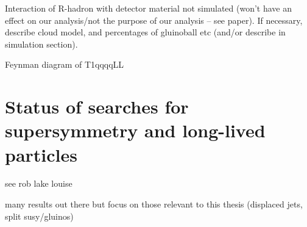 Interaction of R-hadron with detector material not simulated (won't have an 
effect on our analysis/not the purpose of our analysis -- see paper). If 
necessary, describe cloud model, and percentages of gluinoball etc (and/or 
describe in simulation section).

Feynman diagram of T1qqqqLL %






\begin{comment}
Define compressed and uncompressed? Mention ISR/FSR? (Adam)
\end{comment}

\section{Status of searches for supersymmetry and long-lived particles}
see rob lake louise

many results out there but focus on those relevant to this thesis (displaced 
jets, split susy/gluinos)

